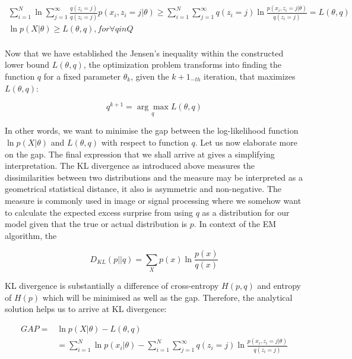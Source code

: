 \begin{gather}
\sum_{i=1}^{N} \ln \sum_{j=1}^{\infty} \frac{q(z_i = j)}{q(z_i = j)} p(x_i, z_i = j|\theta) \geq \sum_{i=1}^{N} \sum_{j=1}^{\infty} q(z_i = j) \ln \frac{p(x_i, z_i = j|\theta)}{q(z_i = j)} = L(\theta,q) \\
\ln p(X|\theta) \geq L(\theta,q), for \forall q in Q \\
\end{gather}

Now that we have established the Jensen's inequality within the constructed lower bound $L(\theta,q)$, the optimization problem transforms into finding the function $q$ for a fixed parameter $\theta_k$, given the $k+1_{-th}$ iteration, that maximizes $L(\theta, q)$:

\begin{equation}
q^{k+1} = \underset{q}{\arg\max} L(\theta, q)
\end{equation}

In other words, we want to minimise the gap between the log-likelihood function $\ln p(X|\theta)$ and $L(\theta, q)$ with respect to function $q$. Let us now elaborate more on the gap. The final expression that we shall arrive at gives a simplifying interpretation. The KL divergence as introduced above measures the dissimilarities between two distributions and the measure may be interpreted as a geometrical statistical distance, it also is asymmetric and non-negative. The measure is commonly used in image or signal processing where we somehow want to calculate the expected excess surprise from using $q$ as a distribution for our model given that the true or actual distribution is $p$. In context of the EM algorithm, the

\begin{equation}
D_{KL} (p || q) = \sum_{X} p(x) \ln \frac{p(x)}{q(x)}
\end{equation}

KL divergence is substantially a difference of cross-entropy $H(p,q)$ and entropy of $H(p)$ which will be minimised as well as the gap. Therefore, the analytical solution helps us to arrive at KL divergence:

\begin{align*}
GAP = & \ln p(X|\theta) - L(\theta, q) \\
&= \sum_{i=1}^{N} \ln p(x_i|\theta) - \sum_{i=1}^{N} \sum_{j=1}^{\infty} q(z_i = j) \ln \frac{p(x_i, z_i = j|\theta)}{q(z_i = j)} \\
\end{align*}

